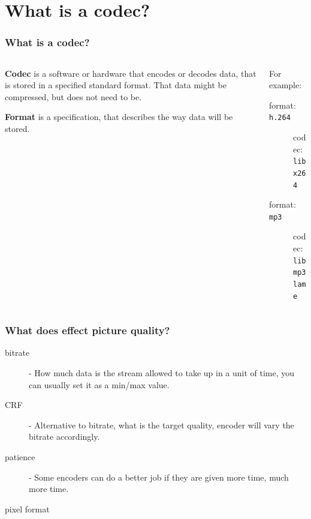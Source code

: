 \documentclass[aspectratio=169]{beamer}
\begin{document}
\begin{figure}
    
    \centering
\end{figure}

\section{What is a codec?}
\begin{frame}
    \frametitle{What is a codec?}
    \begin{columns}
        \begin{column}{ .5\textwidth }
            \textbf{Codec} is a software or hardware that encodes or decodes data, that is stored in a specified standard format. That data might be compressed, but does not need to be.

            \pause\vspace{.5cm}

            \textbf{Format} is a specification, that describes the way data will be stored.
        \end{column}
        \begin{column}{.5\textwidth}
            For example:
            \begin{description}
                \item[format: \texttt{h.264}] codec: \texttt{libx264}
                \item[format: \texttt{mp3}] codec: \texttt{libmp3lame}
            \end{description}
        \end{column}
    \end{columns}
\end{frame}

\begin{frame}
    \frametitle{What does effect picture quality?}
    \begin{description}
        \item[bitrate] - How much data is the stream allowed to take up in a unit of time, you can usually set it as a min/max value.
        \item[CRF] - Alternative to bitrate, what is the target quality, encoder will vary the bitrate accordingly.
        \item[patience] - Some encoders can do a better job if they are given more time, much more time.
        \item[pixel format]
    \end{description}
\end{frame}
\end{document}
